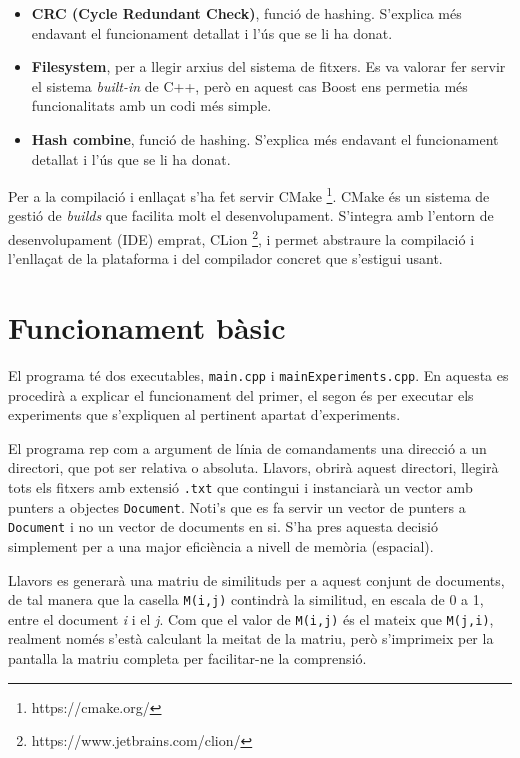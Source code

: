 \documentclass[catalan, 12pt]{report}
\begin{document}
\begin{itemize}
\item \textbf{CRC (Cycle Redundant Check)}, funció de hashing. S'explica més endavant el funcionament detallat i l'ús que se li ha donat.
\item \textbf{Filesystem}, per a llegir arxius del sistema de fitxers. Es va valorar fer servir el sistema \textit{built-in} de C++, però en aquest cas Boost ens permetia més funcionalitats amb un codi més simple.
\item \textbf{Hash combine}, funció de hashing. S'explica més endavant el funcionament detallat i l'ús que se li ha donat.
\end{itemize}

Per a la compilació i enllaçat s'ha fet servir CMake \footnote{https://cmake.org/}. CMake és un sistema de gestió de \textit{builds} que facilita molt el desenvolupament. S'integra amb l'entorn de desenvolupament (IDE) emprat, CLion \footnote{https://www.jetbrains.com/clion/}, i permet abstraure la compilació i l'enllaçat de la plataforma i del compilador concret que s'estigui usant.

\section{Funcionament bàsic}

El programa té dos executables, \verb|main.cpp| i \verb|mainExperiments.cpp|. En aquesta es procedirà a explicar el funcionament del primer, el segon és per executar els experiments que s'expliquen al pertinent apartat d'experiments.\newline

El programa rep com a argument de línia de comandaments una direcció a un directori, que pot ser relativa o absoluta. Llavors, obrirà aquest directori, llegirà tots els fitxers amb extensió \verb|.txt| que contingui i instanciarà un vector amb punters a objectes \verb|Document|. Noti's que es fa servir un vector de punters a \verb|Document| i no un vector de documents en si. S'ha pres aquesta decisió simplement per a una major eficiència a nivell de memòria (espacial).\newline

Llavors es generarà una matriu de similituds per a aquest conjunt de documents, de tal manera que la casella \verb|M(i,j)| contindrà la similitud, en escala de 0 a 1, entre el document \textit{i} i el \textit{j}. Com que el valor de \verb|M(i,j)| és el mateix que \verb|M(j,i)|, realment només s'està calculant la meitat de la matriu, però s'imprimeix per la pantalla la matriu completa per facilitar-ne la comprensió.\newline
\end{document}
